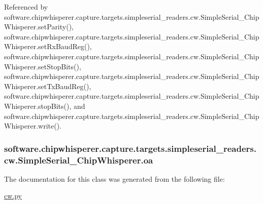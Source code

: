Referenced by software.\+chipwhisperer.\+capture.\+targets.\+simpleserial\+\_\+readers.\+cw.\+Simple\+Serial\+\_\+\+Chip\+Whisperer.\+set\+Parity(), software.\+chipwhisperer.\+capture.\+targets.\+simpleserial\+\_\+readers.\+cw.\+Simple\+Serial\+\_\+\+Chip\+Whisperer.\+set\+Rx\+Baud\+Reg(), software.\+chipwhisperer.\+capture.\+targets.\+simpleserial\+\_\+readers.\+cw.\+Simple\+Serial\+\_\+\+Chip\+Whisperer.\+set\+Stop\+Bits(), software.\+chipwhisperer.\+capture.\+targets.\+simpleserial\+\_\+readers.\+cw.\+Simple\+Serial\+\_\+\+Chip\+Whisperer.\+set\+Tx\+Baud\+Reg(), software.\+chipwhisperer.\+capture.\+targets.\+simpleserial\+\_\+readers.\+cw.\+Simple\+Serial\+\_\+\+Chip\+Whisperer.\+stop\+Bits(), and software.\+chipwhisperer.\+capture.\+targets.\+simpleserial\+\_\+readers.\+cw.\+Simple\+Serial\+\_\+\+Chip\+Whisperer.\+write().

\hypertarget{classsoftware_1_1chipwhisperer_1_1capture_1_1targets_1_1simpleserial__readers_1_1cw_1_1SimpleSerial__ChipWhisperer_a0dcbd1e5567a535cd88ae4f774700ad4}{}
\subsubsection[{oa}]{\setlength{\rightskip}{0pt plus 5cm}software.\+chipwhisperer.\+capture.\+targets.\+simpleserial\+\_\+readers.\+cw.\+Simple\+Serial\+\_\+\+Chip\+Whisperer.\+oa}\label{classsoftware_1_1chipwhisperer_1_1capture_1_1targets_1_1simpleserial__readers_1_1cw_1_1SimpleSerial__ChipWhisperer_a0dcbd1e5567a535cd88ae4f774700ad4}


The documentation for this class was generated from the following file\+:\begin{DoxyCompactItemize}
\item 
\hyperlink{cw_8py}{cw.\+py}\end{DoxyCompactItemize}
